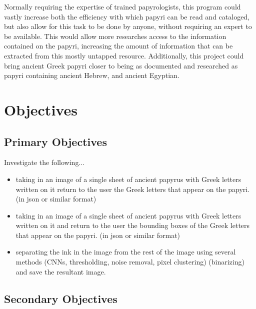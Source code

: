 \documentclass[12pt,a4paper,final]{article}
\begin{document}
Normally requiring the expertise of trained papyrologists, this program could vastly increase both the efficiency with which papyri can be read and cataloged, but also allow for this task to be done by anyone, without requiring an expert to be available. This would allow more researches access to the information contained on the papyri, increasing the amount of information that can be extracted from this mostly untapped resource. Additionally, this project could bring ancient Greek papyri closer to being as documented and researched as papyri containing ancient Hebrew, and ancient Egyptian.

\section{Objectives}

\subsection{Primary Objectives}
Investigate the following...

\begin{itemize}
  \item taking in an image of a single sheet of ancient papyrus with Greek letters written on it return to the user the Greek letters that appear on the papyri. (in json or similar format)
  \item taking in an image of a single sheet of ancient papyrus with Greek letters written on it and return to the user the bounding boxes of the Greek letters that appear on the papyri. (in json or similar format)
  \item separating the ink in the image from the rest of the image using several methods (CNNs, thresholding, noise removal, pixel clustering) (binarizing) and save the resultant image.
\end{itemize}

\subsection{Secondary Objectives}
\end{document}
